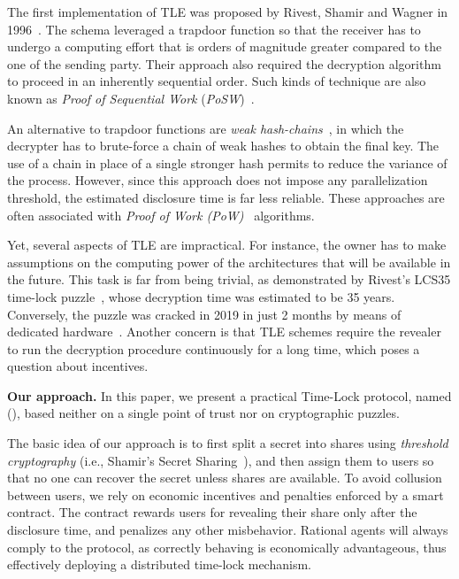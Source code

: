 The first implementation of TLE was proposed by Rivest, Shamir and Wagner in 1996~\cite{Rivest:1996:TPT:888615}.
The schema leveraged a trapdoor function so that the receiver has to undergo a computing effort that is orders of magnitude greater compared to the one of the sending party. Their approach also required the decryption algorithm to proceed in an inherently sequential order.
Such kinds of technique are also known as {\em Proof of Sequential Work} ({\em PoSW})~\cite{posw,cohen2018}.

An alternative to trapdoor functions are {\em weak hash-chains}~\cite{gwern}, in which the decrypter has to brute-force a chain of weak hashes to obtain the final key.
The use of a chain in place of a single stronger hash permits to reduce the variance of the process. 
However, since this approach does not impose any parallelization threshold, the estimated disclosure time is far less reliable.
These approaches are often associated with {\em Proof of Work (PoW)}~\cite{pow} algorithms.

Yet, several aspects of TLE are impractical. For instance, 
%
the owner has to make assumptions on the computing power of the architectures that will be available in the future. 
This task is far from being trivial, as demonstrated by Rivest's LCS35 time-lock puzzle~\cite{lcs35}, whose decryption time was estimated to be 35 years. Conversely, the puzzle was cracked in 2019 in just 2 months by means of dedicated hardware~\cite{lcs35-crack-open}.
%
Another concern is that TLE schemes require the revealer to run the decryption procedure continuously for a long time, which poses a question about incentives.


\medskip\textbf{Our approach.} In this paper, we present a practical Time-Lock protocol, named {\em \name} ({\em \shortname}), based neither on a single point of trust nor on cryptographic puzzles.

The basic idea of our approach is to first split a secret into shares using {\em threshold cryptography} (i.e., Shamir's Secret Sharing~\cite{Shamir:1979:SS:359168.359176}), and then assign them to users so that no one can recover the secret unless \KofN shares are available.
To avoid collusion between users, we rely on economic incentives and penalties enforced by a smart contract.
The contract rewards users for revealing their share only after the disclosure time, and penalizes any other misbehavior. 
Rational agents will always comply to the protocol, as correctly behaving is economically advantageous, thus effectively deploying a distributed time-lock mechanism.

